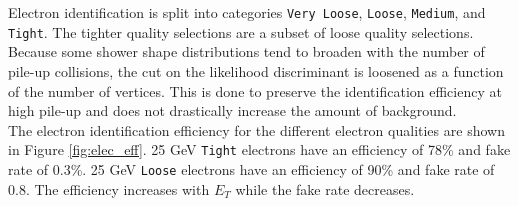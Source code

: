 \indent Electron identification is split into categories {\tt Very Loose}, {\tt Loose}, {\tt Medium},  and {\tt Tight}.  The tighter quality selections are a subset of loose quality selections. Because some shower shape distributions tend to broaden with the number of pile-up collisions, the cut on the likelihood discriminant is loosened as a function of the number of vertices. This is done to preserve the identification efficiency at high pile-up and does not drastically increase the amount of background.\cite{EleID}  \\  %

\indent The electron identification efficiency for the different electron qualities are shown in Figure \ref{fig:elec_eff}.  25 GeV {\tt Tight} electrons have an efficiency of 78\% and fake rate of 0.3\%.  25 GeV {\tt Loose} electrons have an efficiency of 90\% and fake rate of 0.8.  The efficiency increases with $E_T$ while the fake rate decreases.\cite{EleID} \\

